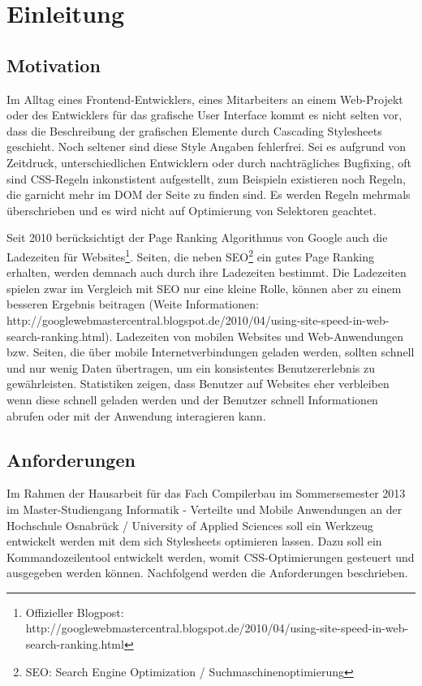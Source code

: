 \section{Einleitung}

\subsection{Motivation}
Im Alltag eines Frontend-Entwicklers, eines Mitarbeiters an einem Web-Projekt oder des Entwicklers für das grafische User Interface kommt es nicht selten vor, dass die Beschreibung der grafischen Elemente durch Cascading Stylesheets geschieht. Noch seltener sind diese Style Angaben fehlerfrei. Sei es aufgrund von Zeitdruck, unterschiedlichen Entwicklern oder durch nachträgliches Bugfixing, oft sind CSS-Regeln inkonstistent aufgestellt, zum Beispieln existieren noch Regeln, die garnicht mehr im DOM der Seite zu finden sind. Es werden Regeln mehrmals überschrieben und es wird nicht auf Optimierung von Selektoren geachtet. 

Seit 2010 berücksichtigt der Page Ranking Algorithmus von Google auch die Ladezeiten für Websites\footnote{Offizieller Blogpost: http://googlewebmastercentral.blogspot.de/2010/04/using-site-speed-in-web-search-ranking.html}. Seiten, die neben SEO\footnote{SEO: Search Engine Optimization / Suchmaschinenoptimierung} ein gutes Page Ranking erhalten, werden demnach auch durch ihre Ladezeiten bestimmt. Die Ladezeiten spielen zwar im Vergleich mit SEO nur eine kleine Rolle, können aber zu einem besseren Ergebnis beitragen (Weite Informationen: http://googlewebmastercentral.blogspot.de/2010/04/using-site-speed-in-web-search-ranking.html).
Ladezeiten von mobilen Websites und Web-Anwendungen bzw. Seiten, die über mobile Internetverbindungen geladen werden, sollten schnell und nur wenig Daten übertragen, um ein konsistentes Benutzererlebnis zu gewährleisten. Statistiken zeigen, dass Benutzer auf Websites eher verbleiben wenn diese schnell geladen werden und der Benutzer schnell Informationen abrufen oder mit der Anwendung interagieren kann.

\subsection{Anforderungen}

Im Rahmen der Hausarbeit für das Fach Compilerbau im Sommersemester 2013 im Master-Studiengang Informatik - Verteilte und Mobile Anwendungen an der Hochschule Osnabrück / University of Applied Sciences soll ein Werkzeug entwickelt werden mit dem sich Stylesheets optimieren lassen. Dazu soll ein Kommandozeilentool entwickelt werden, womit CSS-Optimierungen gesteuert und ausgegeben werden können. Nachfolgend werden die Anforderungen beschrieben.

